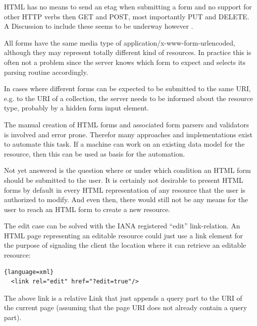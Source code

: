 \documentclass[11pt,a4paper,headsepline,twoside]{scrartcl}		%
\begin{document}
HTML has no means to send an etag when submitting a form and no support for
other HTTP verbs then GET and POST, most importantly PUT and DELETE. A
Discussion to include these seems to be underway however \cite{Amundsen2011}.

All forms have the same media type of application/x-www-form-urlencoded,
although they may represent totally different kind of resources. In practice
this is often not a problem since the server knows which form to expect and
selects its parsing routine accordingly.

In cases where different forms can be expected to be submitted to the same URI,
e.g. to the URI of a collection, the server needs to be informed about the
resource type, probably by a hidden form input element.

The manual creation of HTML forms and associated form parsers and validators is
involved and error prone. Therefor many approaches and implementations exist to
automate this task. If a machine can work on an existing data model for the
resource, then this can be used as basis for the automation.


Not yet answered is the question where or under which condition an HTML form
should be submitted to the user. It is certainly not desirable to present HTML
forms by default in every HTML representation of any resource that the user is
authorized to modify. And even then, there would still not be any means for the
user to reach an HTML form to create a new resource.

The edit case can be solved with the IANA registered ``edit'' link-relation. An
HTML page representing an editable resource could just use a link element for
the purpose of signaling the client the location where it can retrieve an
editable resource:

\begin{lstlisting}{language=xml}
  <link rel="edit" href="?edit=true"/>
\end{lstlisting}

The above link is a relative Link that just appends a query part to the URI of
the current page (assuming that the page URI does not already contain a query
part).
\end{document}
